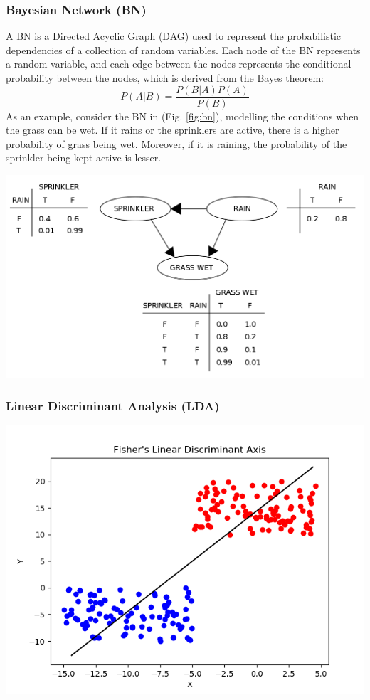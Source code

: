 \documentclass[a4paper, 12pt]{article}
\begin{document}
\subsubsection{Bayesian Network (BN)}
\noindent A BN is a Directed Acyclic Graph (DAG) used to represent the probabilistic dependencies of a collection of random variables. Each node of the BN represents a random variable, and each edge between the nodes represents the conditional probability between the nodes, which is derived from the Bayes theorem:
\begin{equation}
    P(A|B) = \frac{P(B|A)P(A)}{P(B)}
\end{equation}
As an example, consider the BN in (Fig. \ref{fig:bn}), modelling the conditions when the grass can be wet. If it rains or the sprinklers are active, there is a higher probability of grass being wet. Moreover, if it is raining, the probability of the sprinkler being kept active is lesser.
\begin{center}
\includegraphics[scale=0.3]{bn.png}
\label{fig:bn}
\end{center}

\vskip 0.2in
\subsubsection{Linear Discriminant Analysis (LDA)}
\begin{center}
\includegraphics[scale=0.8]{lda.png}
\label{fig:lda}
\end{center}
\end{document}
